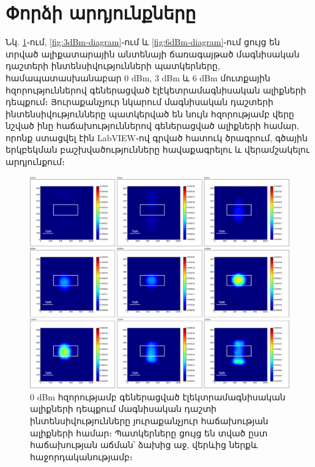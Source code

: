 \documentclass[12pt, fleqn]{report}
\begin{document}
\newpage

\section{Փորձի արդյունքները}
 Նկ. \ref{fig:0dBm-diagram}֊ում, \ref{fig:3dBm-diagram}֊ում և \ref{fig:6dBm-diagram}֊ում ցույց են տրված ալիքատարային անտենայի ճառագայթած մագնիսական դաշտերի ինտենսիվությունների պատկերները, համապատասխանաբար 0 dBm, 3 dBm և 6 dBm մուտքային հզորություններով գեներացված էլէկետրամագնիսական ալիքների դեպքում։ Յուրաքանչյուր նկարում մագնիսական դաշտերի ինտենսիվությունները պատկերված են նույն հզորությամբ վերը նշված ինը հաճախություններով գեներացված ալիքների համար, որոնք ստացվել էին LabVIEW֊ով գրված հատուկ ծրագրում, գծային երկբեկման բաշխվածությունները հավաքագրելու և վերամշակելու արդյունքում։
\begin{figure}
    \begin{adjustwidth}{-0.8cm}{}
    \centering
    \includegraphics[width=1.0\linewidth]{data/experiment-results/free field of antenna, 6-14ghz, 0dbm generator output, distance 5mm.png}
    \caption{0 dBm հզորությամբ գեներացված էլեկտրամագնիսական ալիքների դեպքում մագնիսական դաշտի ինտենսիվությունները յուրաքանչյուր հաճախության ալիքների համար։ Պատկերները ցույց են տված ըստ հաճախության աճման՝ ձախից աջ, վերևից ներքև հաջորդականությամբ։}
    \label{fig:0dBm-diagram}
\end{adjustwidth}
\end{figure}
\end{document}
